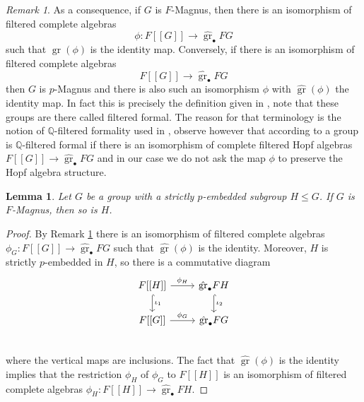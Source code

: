 \documentclass[10pt, oneside]{amsart}
\newcommand{\Q}{\mathbb{Q}}
\newcommand{\gr}{\operatorname{gr}} %
\newtheorem{lemma}[theorem]{Lemma}
\theoremstyle{definition}
\theoremstyle{remark}
\newtheorem{remark}[theorem]{Remark}
\theoremstyle{plain}
\begin{document}
\begin{remark}\label{rem:Giorgiofiltered} As a consequence, if $G$ is $F$-Magnus, then there is an isomorphism of filtered complete algebras
$$\phi:F[[G]]\to\hat{\gr}_\bullet FG$$
such that $\gr(\phi)$ is the identity map. Conversely, if there is an isomorphism of filtered complete algebras
$$F[[G]]\to\hat{\gr}_\bullet FG$$ 
then $G$ is $p$-Magnus and there is also such an isomorphism $\phi$ with $\hat{\gr}(\phi)$ the identity map. In fact this is precisely the definition given in \cite[Definition 5.5.1]{GiorgioThesis}, note that these groups are there called filtered formal. The reason for that terminology is the notion of $\Q$-filtered formality used in \cite[Proposition 2.5]{SuciuWangT}, observe however that according to \cite{SuciuWangT} a group is $\Q$-filtered formal if there is an isomorphism of complete filtered Hopf algebras $F[[G]]\to\hat{\gr}_\bullet FG$ and in our case we do not ask the map $\phi$ to preserve the Hopf algebra structure. 
\end{remark}

 


\begin{lemma}\label{lem:filteredembed} Let $G$ be a group with a strictly $p$-embedded subgroup $H\leq G$. If $G$ is $F$-Magnus, then so is $H$.
\end{lemma}
\begin{proof} By Remark \ref{rem:Giorgiofiltered} there is an isomorphism of filtered complete algebras $\phi_G:F[[G]]\to\hat{\gr}_\bullet FG$ such that $\hat{\gr}(\phi)$ is the identity. Moreover,
$H$ is strictly $p$-embedded in $H$, so there is a commutative diagram
\[\begin{tikzcd}
    F[[H]]\ar[d, hook,"\iota_1"]\ar[r,"\phi_H"]&\hat{\gr}_\bullet FH\ar[d, hook,"\iota_2"]\\
   F[[G]]\ar[r,"\phi_G"]&\hat{\gr}_\bullet FG\\
\end{tikzcd}
\]
where the vertical maps are inclusions.
The fact that $\hat{\gr}(\phi)$ is the identity implies that the restriction $\phi_H$ of $\phi_G$ to $F[[H]]$ is an isomorphism of filtered complete algebras $\phi_H:F[[H]]\to\hat{\gr}_\bullet FH$.
\end{proof}
\end{document}
